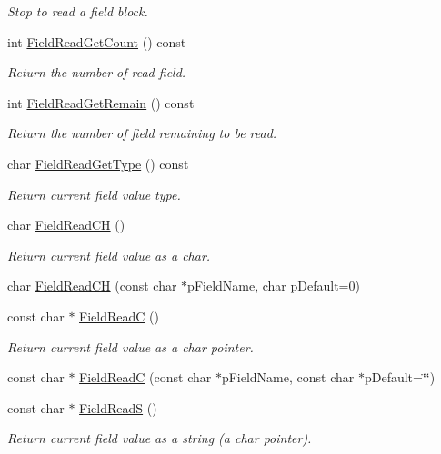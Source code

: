 \begin{Indent}
\begin{DoxyCompactItemize}
\begin{DoxyCompactList}\small\item\em Stop to read a field block. \end{DoxyCompactList}\item 
int \hyperlink{class_fbx_i_o_ac16b7b04584db7cf626fc1dc04f199fe}{Field\+Read\+Get\+Count} () const
\begin{DoxyCompactList}\small\item\em Return the number of read field. \end{DoxyCompactList}\item 
int \hyperlink{class_fbx_i_o_ae47d1a1c19c8bf72570fb0d76c19f9eb}{Field\+Read\+Get\+Remain} () const
\begin{DoxyCompactList}\small\item\em Return the number of field remaining to be read. \end{DoxyCompactList}\item 
char \hyperlink{class_fbx_i_o_af4678c1d469f444fe96bead9668f4083}{Field\+Read\+Get\+Type} () const
\begin{DoxyCompactList}\small\item\em Return current field value type. \end{DoxyCompactList}\item 
char \hyperlink{class_fbx_i_o_a71586431ebc531843b96971bb2c0911f}{Field\+Read\+CH} ()
\begin{DoxyCompactList}\small\item\em Return current field value as a char. \end{DoxyCompactList}\item 
char \hyperlink{class_fbx_i_o_a0eb47742cf83d721054efcb5c2f361c6}{Field\+Read\+CH} (const char $\ast$p\+Field\+Name, char p\+Default=0)
\item 
const char $\ast$ \hyperlink{class_fbx_i_o_a2f03e158c67003cab8854496825c838f}{Field\+ReadC} ()
\begin{DoxyCompactList}\small\item\em Return current field value as a char pointer. \end{DoxyCompactList}\item 
const char $\ast$ \hyperlink{class_fbx_i_o_a585513a3c243c7cfbd7cbed78bb14382}{Field\+ReadC} (const char $\ast$p\+Field\+Name, const char $\ast$p\+Default=\char`\"{}\char`\"{})
\item 
const char $\ast$ \hyperlink{class_fbx_i_o_af6d036e6ffdf7d66d16f6ff0ae5768f9}{Field\+ReadS} ()
\begin{DoxyCompactList}\small\item\em Return current field value as a string (a char pointer). \end{DoxyCompactList}\item 

\end{DoxyCompactItemize}
\end{Indent}
